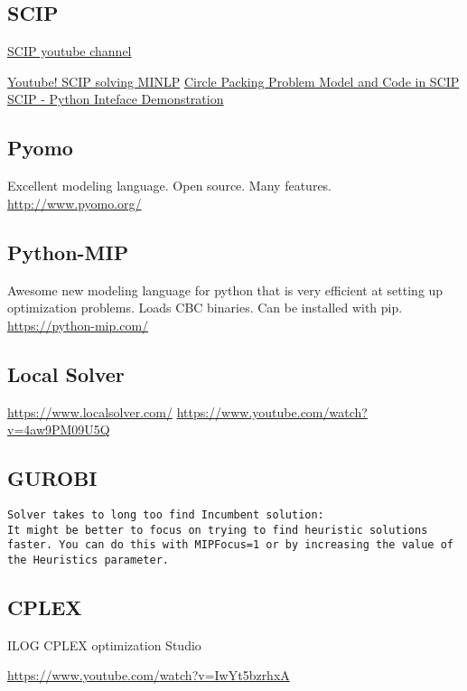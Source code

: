 \documentclass[letter,12pt]{book}
\renewcommand{\0}{\mathbf{0}}
\begin{document}
\subsection{SCIP}
\href{https://www.youtube.com/channel/UCpu5Kj1Q9SQ1kZ1QlwsurAQ}{SCIP youtube channel}

\href{https://www.youtube.com/watch?v=FFqGzckSRW4}{Youtube! SCIP solving MINLP}
\href{https://youtu.be/FFqGzckSRW4?t=734}{Circle Packing Problem Model and Code in SCIP}
\href{https://www.youtube.com/watch?v=7SvapoXVYq0}{SCIP - Python Inteface Demonstration}

\subsection{Pyomo}
Excellent modeling language.  Open source.  Many features.
\url{http://www.pyomo.org/}

\subsection{Python-MIP}
Awesome new modeling language for python that is very efficient at setting up optimization problems.  Loads CBC binaries.  Can be installed with pip.
\url{https://python-mip.com/}


\subsection{Local Solver}

\url{https://www.localsolver.com/}
\url{https://www.youtube.com/watch?v=4aw9PM09U5Q}

\subsection{GUROBI}

\begin{verbatim}
Solver takes to long too find Incumbent solution:
It might be better to focus on trying to find heuristic solutions faster. You can do this with MIPFocus=1 or by increasing the value of the Heuristics parameter.
\end{verbatim}

\subsection{CPLEX}

ILOG CPLEX optimization Studio

\url{https://www.youtube.com/watch?v=IwYt5bzrhxA}
\end{document}
